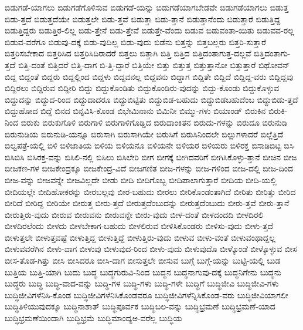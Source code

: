 {ಬಿಡುಗಡೆ-ಯಾಗಲು
ಬಿಡುಗಡೆಗೊಳಿಸುವ
ಬಿಡುಗಡೆ-ಯನ್ನು
ಬಿಡುಗಡೆಯಾಗಬೇಡವೇ
ಬಿಡುಗಡೆಯಾಗಲು
ಬಿಡುತ್ತ
ಬಿಡು-ತ್ತದೆ
ಬಿಡುತ್ತದೆಯೇ
ಬಿಡುತ್ತಲೇ
ಬಿಡು-ತ್ತವೆ
ಬಿಡುತ್ತಾ
ಬಿಡು-ತ್ತಾನೆ
ಬಿಡುತ್ತಾನೆಂದು
ಬಿಡುತ್ತಾರೆ
ಬಿಡುತ್ತಿದ್ದ
ಬಿಡುತ್ತಿದ್ದರು
ಬಿಡುತ್ತಿರ-ಲಿಲ್ಲ
ಬಿಡು-ತ್ತೇನೆ
ಬಿಡು-ತ್ತೇವೆ
ಬಿಡುತ್ತೇ-ವೆಂದು
ಬಿಡುವ
ಬಿಡುವಂತಾ-ಯಿತು
ಬಿಡುವವ-ರಲ್ಲ
ಬಿಡುವ-ವರೆಗೂ
ಬಿಡುವು-ದಕ್ಕೆ
ಬಿಡು-ವುದಿಲ್ಲ
ಬಿಡು-ವುದು
ಬಿಡೆನು
ಬಿತ್ತನ್ನು
ಬಿತ್ತಬಲ್ಲರು
ಬಿತ್ತರಿ-ಸುತ್ತಾರೆ
ಬಿತ್ತರಿಸಬೇಕಾದ
ಬಿತ್ತರಿಸಿದ
ಬಿತ್ತರಿಸಿದಿರಾದರೆ
ಬಿತ್ತಲು
ಬಿತ್ತಾಗಿ
ಬಿತ್ತಿ
ಬಿತ್ತಿದ
ಬಿತ್ತಿದಂತಾಗುತ್ತ-ದಲ್ಲವೆ
ಬಿತ್ತಿದಂತಾಗು-ತ್ತದೆ
ಬಿತ್ತಿ-ದಂತೆ
ಬಿತ್ತಿದರೆ
ಬಿತ್ತಿ-ದಾಗ
ಬಿ-ತ್ತಿ-ದ್ದಾರೆ
ಬಿತ್ತಿಯೇ
ಬಿತ್ತು
ಬಿತ್ತುತ್ತ
ಬಿತ್ತುತ್ತಾನೋ
ಬಿತ್ತುತ್ತಾರೆ
ಬಿಥೋವನ್
ಬಿದ್ದ
ಬಿದ್ದಂತೆ
ಬಿದ್ದರು
ಬಿದ್ದಲ್ಲಿಂದ
ಬಿದ್ದಳು
ಬಿದ್ದವನಲ್ಲ
ಬಿದ್ದವನು
ಬಿದ್ದಾಗ
ಬಿದ್ದಿತೇ
ಬಿದ್ದಿದೆ
ಬಿದ್ದಿದ್ದ-ವರು
ಬಿದ್ದಿದ್ದವು
ಬಿದ್ದಿರಲು
ಬಿದ್ದಿರುವ
ಬಿದ್ದೀರಿ
ಬಿದ್ದು
ಬಿದ್ದುಕೊಂಡಿತು
ಬಿದ್ದುಕೊಂಡಿರು-ವುದನ್ನು
ಬಿದ್ದು-ಕೊಂಡು
ಬಿದ್ದುಕೊಳ್ಳುವ
ಬಿದ್ದುದನ್ನು
ಬಿದ್ದುದ-ರಿಂದ
ಬಿದ್ದುದಾದರೂ
ಬಿದ್ದುಬಿಟ್ಟಿತು
ಬಿದ್ದುಬಿಡ-ಬಹುದು
ಬಿದ್ದುಬಿಡಬಹುದೆಂಬ
ಬಿದ್ದುಬಿಡು-ತ್ತದೆ
ಬಿದ್ದುಹೋದ
ಬಿದ್ದೆ
ಬಿನದ
ಬಿನ್ನವಿಸಿ-ಕೊಂಡ
ಬಿಭೇಮಿನಾನು
ಬಿಮಿನೀ
ಬಿಮ್ಮು-ಗಳು
ಬಿಯಾಂಡ್
ಬಿರುಕಿನ
ಬಿರುಕಿ-ನಿಂದ
ಬಿರುಕು
ಬಿರುಕುಗೊಳಿ
ಬಿರುಗಾಳಿ
ಬಿರುಗಾಳಿಗೊಡ್ಡಿದ
ಬಿರುದಾಂಕಿತನ
ಬಿರುದು-ಗಳನ್ನು
ಬಿರುದೂ
ಬಿರುನುಡಿ
ಬಿರುನುಡಿಯ
ಬಿರುನುಡಿ-ಯನ್ನೂ
ಬಿರುಸಾಗಿ
ಬಿರುಸಾಗಿಯೇ
ಬಿರುಸಿಗೆ
ಬಿರುಸಿನಿಂದಲೇ
ಬಿಲ್ಲುಗಳಾದರೆ
ಬಿಲ್ಲೆತ್ತಿದೆ
ಬಿಲ್ವಪತ್ರೆ-ಯಲ್ಲಿ
ಬಿಳಿ
ಬಿಳಿಜಾತಿಯ
ಬಿಳಿಯ
ಬಿಳಿಯನೂ
ಬಿಳಿಯನೇ
ಬಿಳಿಯರ
ಬಿಳಿಯರು
ಬಿಳಿರಕ್ತ
ಬಿಸಾಡಿಬಿಟ್ಟ
ಬಿಸಿ
ಬಿಸಿಬಿಸಿ
ಬಿಸಿರಕ್ತ-ವನ್ನು
ಬಿಸಿಲಿ-ನಲ್ಲಿ
ಬಿಸಿಲು
ಬಿಸಿಲೇರಿ
ಬೀಗ
ಬೀಗಕ್ಕೆ
ಬೀಗಿದವರಿಗೆ
ಬೀಗಿಸಿಕೊಳ್ಳು-ತ್ತಾನೆ
ಬೀಚಿನ
ಬೀಜ
ಬೀಜಕಣ-ಗಳ
ಬೀಜಕೇಂದ್ರಕ್ಕೂ
ಬೀಜಕೇಂದ್ರ-ವಿದೆ
ಬೀಜಗಣಿತ
ಬೀಜ-ಗಳನ್ನು
ಬೀಜ-ಗಳಿಂದ
ಬೀಜ-ದಲ್ಲಿ
ಬೀಜ-ದಿಂದ
ಬೀಜ-ವನ್ನು
ಬೀಜವನ್ನೇ
ಬೀಜವಿಲ್ಲದೇ
ಬೀಡು
ಬೀದಿ
ಬೀದಿಗೊಬ್ಬ
ಬೀದಿಪಾಲಾಗುತ್ತಾರೆ
ಬೀದಿಯ
ಬೀದಿ-ಯಲ್ಲಿ
ಬೀದಿಯಲ್ಲೇ
ಬೀದಿಹೋಕರನ್ನು
ಬೀರಬಲ್ಲವು
ಬೀರ-ಬಹುದು
ಬೀರಲು
ಬೀರಿಕೊಂಡಂತಾಗಿದೆ
ಬೀರಿತು
ಬೀರಿತ್ತು
ಬೀರಿದ
ಬೀರಿದೆ
ಬೀರಿದ್ದ
ಬೀರಿಯೇ
ಬೀರುತ್ತ
ಬೀರು-ತ್ತದೆ
ಬೀರುತ್ತದೆಂಬುದನ್ನು
ಬೀರುತ್ತದೆಂಬುದು
ಬೀರು-ತ್ತವೆ
ಬೀರು-ತ್ತಾನೆ
ಬೀರುತ್ತಿರು-ವುದು
ಬೀರುವ
ಬೀರುವನು
ಬೀರುವನ್ನೇ
ಬೀರು-ವುದು
ಬೀಳ-ದಂತೆ
ಬೀಳದಂದದಿ
ಬೀಳದಿರಲಿ
ಬೀಳದಿರಲೆಂದು
ಬೀಳದು
ಬೀಳಬೇಕಾಗ-ಬಹುದು
ಬೀಳಲಿರುವ
ಬೀಳಿಸಿಕೊಂಡರು
ಬೀಳಿಸು-ವುದು
ಬೀಳು-ತ್ತದೆ
ಬೀಳುತ್ತಲೇ
ಬೀಳುತ್ತವಷ್ಟೆ
ಬೀಳುತ್ತಿದ್ದ
ಬೀಳುತ್ತಿದ್ದೆ
ಬೀಳುತ್ತಿರು-ವುದು
ಬೀಳುವ
ಬೀಳು-ವಂತೆ
ಬೀಳುವಂಥಾದ್ದಲ್ಲ
ಬೀಳುವವರೆಗಿನ
ಬೀಳು-ವಾಗ
ಬೀಳುವು
ಬೀಳುವುದ-ರಿಂದ
ಬೀಳು-ವುದು
ಬೀಳುವುದೊ
ಬೀಳ್ಕೊಂಡೆ
ಬೀಳ್ಕೊಳ್ಳುವ
ಬೀಸ
ಬೀಸ-ತೊಡ-ಗಿತ್ತು
ಬೀಸಿ
ಬೀಸಿದರೂ
ಬೀಸಿ-ದಾಗ
ಬೀಸುತ್ತಲೇ
ಬೀಸುವ
ಬುಗ್ಗೆ
ಬುಗ್ಗೆ-ಯನ್ನು
ಬುಟ್ಟಿ-ಯಲ್ಲಿ
ಬುಡ
ಬುತ್ತಿಯ
ಬುತ್ತಿ-ಯಾಗಿ
ಬುದು
ಬುದ್ಧ
ಬುದ್ಧಗುರುವಿ-ನಿಂದ
ಬುದ್ಧನ
ಬುದ್ಧನಾಗುವು-ದಕ್ಕೆ
ಬುದ್ಧನಿಗೇನು
ಬುದ್ಧನು
ಬುದ್ಧರು
ಬುದ್ಧಿ
ಬುದ್ಧಿ-ವಾದ-ವನ್ನು
ಬುದ್ಧಿ-ಗಳ
ಬುದ್ಧಿ-ಗಳು
ಬುದ್ಧಿ-ಗಳೇ
ಬುದ್ಧಿಗೆ
ಬುದ್ಧಿಜೀವಿ
ಬುದ್ಧಿಜೀವಿ-ಗಳು
ಬುದ್ಧಿಜೀವಿಗಳೆನಿಸಿ-ಕೊಂಡ
ಬುದ್ಧಿಜೀವಿಗಳೆನಿಸಿಕೊಂಡವರೂ
ಬುದ್ಧಿಜೀವಿಗಳೆನ್ನಿಸಿಕೊಂಡ-ವರು
ಬುದ್ಧಿಜೀವಿಯಾಗಲೀ
ಬುದ್ಧಿತಿಳಿಯುವುದಕ್ಕೂ
ಬುದ್ಧಿನಾಶಾತ್
ಬುದ್ಧಿಪೂರ್ವಕ
ಬುದ್ಧಿಬಲ-ವನ್ನು
ಬುದ್ಧಿಭ್ರಮಣೆ
ಬುದ್ಧಿಭ್ರಮಣೆ-ಯಾದ
ಬುದ್ಧಿಭ್ರಮಣೆಯಿಂದಾಗಿ
ಬುದ್ಧಿಭ್ರಮೆ
ಬುದ್ಧಿಮಾಂದ್ಯಅ-ವರೆಲ್ಲ
ಬುದ್ಧಿಯ
}
